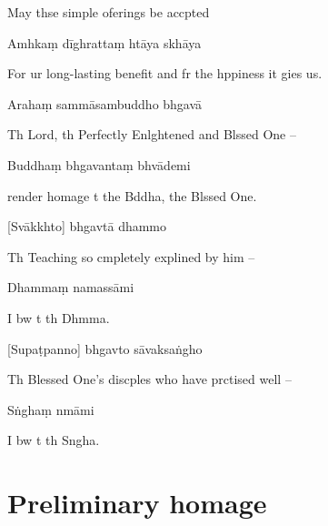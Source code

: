 \begin{english}
May thse simple oferings be accpted
\end{english}

Amhkaṃ dīghrattaṃ htāya skhāya

\begin{english}
For ur long-lasting benefit and fr the hppiness it gies us.
\end{english}

\clearpage

Arahaṃ sammāsambuddho bhgavā

\begin{english}
Th Lord, th Perfectly Enlghtened and Blssed One --
\end{english}

Buddhaṃ bhgavantaṃ bhvādemi

\begin{english}
   render homage t the Bddha, the Blssed One.
\end{english}

[Svākkhto] bhgavtā dhammo

\begin{english}
  Th Teaching so cmpletely explined by him --
\end{english}

Dhammaṃ namassāmi

\begin{english}
  I bw t th Dhmma.
\end{english}

[Supaṭpanno] bhgavto sāvaksaṅgho

\begin{english}
Th Blessed One's discples who have prctised well --
\end{english}

Sṅghaṃ nmāmi

\begin{english}
  I bw t th Sngha.
\end{english}

\chapter[Namo Tassa]{Preliminary homage}

